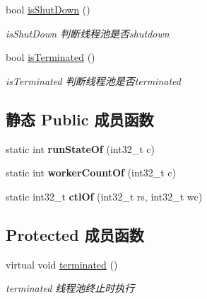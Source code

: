 \begin{DoxyCompactItemize}
bool \hyperlink{classThreadPoolExecutor_ab2306274cb488e3bcf4d14f6042373f7}{is\+Shut\+Down} ()
\begin{DoxyCompactList}\small\item\em is\+Shut\+Down 判断线程池是否shutdown \end{DoxyCompactList}\item 
bool \hyperlink{classThreadPoolExecutor_a50e41a2102a9c5193b419e382f383620}{is\+Terminated} ()
\begin{DoxyCompactList}\small\item\em is\+Terminated 判断线程池是否terminated \end{DoxyCompactList}\end{DoxyCompactItemize}
\subsection*{静态 Public 成员函数}
\begin{DoxyCompactItemize}
\item 
\mbox{\label{classThreadPoolExecutor_aa7ca2a35d562746df0d77bd043bb75f0}} 
static int {\bfseries run\+State\+Of} (int32\+\_\+t c)
\item 
\mbox{\label{classThreadPoolExecutor_af00080b50ff18ef719078b14b3df7291}} 
static int {\bfseries worker\+Count\+Of} (int32\+\_\+t c)
\item 
\mbox{\label{classThreadPoolExecutor_a73773038a4cce87d62e1c7715670aee7}} 
static int32\+\_\+t {\bfseries ctl\+Of} (int32\+\_\+t rs, int32\+\_\+t wc)
\end{DoxyCompactItemize}
\subsection*{Protected 成员函数}
\begin{DoxyCompactItemize}
\item 
\mbox{\label{classThreadPoolExecutor_a61774315237123faf8e7fcc9d35ae47d}} 
virtual void \hyperlink{classThreadPoolExecutor_a61774315237123faf8e7fcc9d35ae47d}{terminated} ()
\begin{DoxyCompactList}\small\item\em terminated 线程池终止时执行 \end{DoxyCompactList}\end{DoxyCompactItemize}


